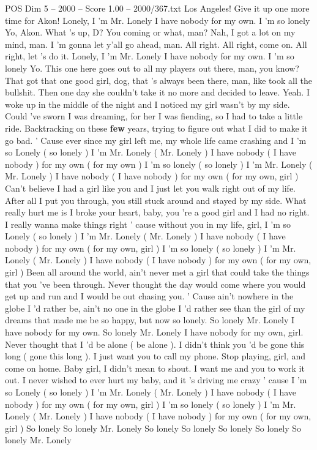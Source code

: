 \begin{textsample}{POS Dim 5 – 2000 – Score 1.00 – 2000/367.txt}  \label{ex:f5_pos_020}
Los Angeles!
Give it up one more time for Akon!
Lonely, I 'm Mr.
Lonely I have nobody for my own.
I 'm so lonely Yo, Akon.
What 's up, D?
You coming or what, man?
Nah, I got a lot on my mind, man.
I 'm gonna let y'all go ahead, man.
All right.
All right, come on.
All right, let 's do it.
Lonely, I 'm Mr.
Lonely I have nobody for my own.
I 'm so lonely Yo.
This one here goes out to all my players out there, man, you know?
That got that one good girl, dog, that 's always been there, man, like took all the bullshit.
Then one day she couldn't take it no more and decided to leave.
Yeah.
I woke up in the middle of the night and I noticed my girl wasn't by my side.
Could 've sworn I was dreaming, for her I was fiending, so I had to take a little ride.
Backtracking on these \textbf{few} years, trying to figure out what I did to make it go bad. ' Cause ever since my girl left me, my whole life came crashing and I 'm so Lonely ( so lonely ) I 'm Mr.
Lonely ( Mr.
Lonely ) I have nobody ( I have nobody ) for my own ( for my own ) I 'm so lonely ( so lonely ) I 'm Mr.
Lonely ( Mr.
Lonely ) I have nobody ( I have nobody ) for my own ( for my own, girl ) Can't believe I had a girl like you and I just let you walk right out of my life.
After all I put you through, you still stuck around and stayed by my side.
What really hurt me is I broke your heart, baby, you 're a good girl and I had no right.
I really wanna make things right ' cause without you in my life, girl, I 'm so Lonely ( so lonely ) I 'm Mr.
Lonely ( Mr.
Lonely ) I have nobody ( I have nobody ) for my own ( for my own, girl ) I 'm so lonely ( so lonely ) I 'm Mr.
Lonely ( Mr.
Lonely ) I have nobody ( I have nobody ) for my own ( for my own, girl ) Been all around the world, ain't never met a girl that could take the things that you 've been through.
Never thought the day would come where you would get up and run and I would be out chasing you. ' Cause ain't nowhere in the globe I 'd rather be, ain't no one in the globe I 'd rather see than the girl of my dreams that made me be so happy, but now so lonely.
So lonely Mr.
Lonely I have nobody for my own.
So lonely Mr.
Lonely I have nobody for my own, girl.
Never thought that I 'd be alone ( be alone ).
I didn't think you 'd be gone this long ( gone this long ).
I just want you to call my phone.
Stop playing, girl, and come on home.
Baby girl, I didn't mean to shout.
I want me and you to work it out.
I never wished to ever hurt my baby, and it 's driving me crazy ' cause I 'm so Lonely ( so lonely ) I 'm Mr.
Lonely ( Mr.
Lonely ) I have nobody ( I have nobody ) for my own ( for my own, girl ) I 'm so lonely ( so lonely ) I 'm Mr.
Lonely ( Mr.
Lonely ) I have nobody ( I have nobody ) for my own ( for my own, girl ) So lonely So lonely Mr.
Lonely So lonely So lonely So lonely So lonely So lonely Mr.
Lonely

\end{textsample}
